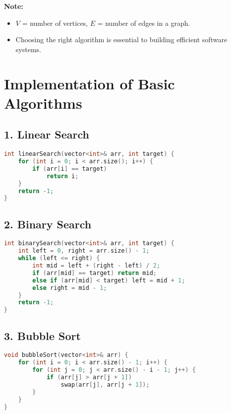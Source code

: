 \vspace{1em}
\textbf{Note:}
\begin{itemize}
  \item $V$ = number of vertices, $E$ = number of edges in a graph.
  \item Choosing the right algorithm is essential to building efficient software systems.
\end{itemize}

\newpage
\section*{\Large \textbf{Implementation of Basic Algorithms}}

\subsection*{\textbf{1. Linear Search}}
\begin{lstlisting}[language=C++, caption=Linear Search]
int linearSearch(vector<int>& arr, int target) {
    for (int i = 0; i < arr.size(); i++) {
        if (arr[i] == target)
            return i;
    }
    return -1;
}
\end{lstlisting}

\subsection*{\textbf{2. Binary Search}}
\begin{lstlisting}[language=C++, caption=Binary Search (Iterative)]
int binarySearch(vector<int>& arr, int target) {
    int left = 0, right = arr.size() - 1;
    while (left <= right) {
        int mid = left + (right - left) / 2;
        if (arr[mid] == target) return mid;
        else if (arr[mid] < target) left = mid + 1;
        else right = mid - 1;
    }
    return -1;
}
\end{lstlisting}

\subsection*{\textbf{3. Bubble Sort}}
\begin{lstlisting}[language=C++, caption=Bubble Sort]
void bubbleSort(vector<int>& arr) {
    for (int i = 0; i < arr.size() - 1; i++) {
        for (int j = 0; j < arr.size() - i - 1; j++) {
            if (arr[j] > arr[j + 1])
                swap(arr[j], arr[j + 1]);
        }
    }
}
\end{lstlisting}

